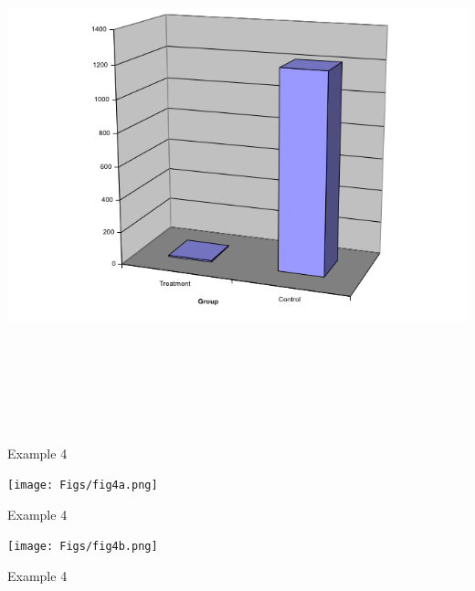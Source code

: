 \documentclass[12pt]{article}
\newcommand{\headsize}{\fontsize{35}{35} \selectfont}
\begin{document}
\centerline{\includegraphics[height=6in]{Figs/fig3d.png}}

\newpage


\headsize \color{yellow}
\hfill \begin{minipage}{5.75in}
\centering
Example 4
\end{minipage}

\vspace{30mm}

\centerline{\texttt{[image: Figs/fig4a.png]}}




\newpage


\headsize \color{yellow}
\hfill \begin{minipage}{5.75in}
\centering
Example 4
\end{minipage}

\vspace{30mm}

\centerline{\texttt{[image: Figs/fig4b.png]}}



\newpage


\headsize \color{yellow}
\hfill \begin{minipage}{5.75in}
\centering
Example 4
\end{minipage}
\end{document}
